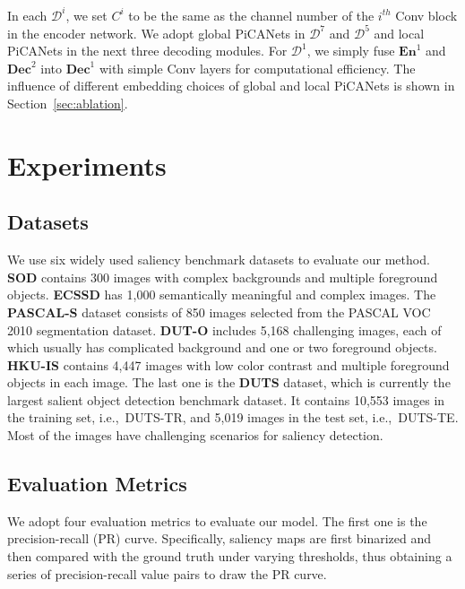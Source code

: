 \documentclass[10pt,twocolumn,letterpaper]{article}
\def\ie{i.e.,~} %
\begin{document}
In each $\mathcal D^i$, we set $C^i$ to be the same as the channel number of the $i^{th}$ Conv block in the encoder network. We adopt global PiCANets in $\mathcal D^7$ and $\mathcal D^5$ and local PiCANets in the next three decoding modules. For $\mathcal D^1$, we simply fuse $\bm{En}^1$ and $\bm{Dec}^2$ into $\bm{Dec}^1$ with simple Conv layers for computational efficiency. The influence of different embedding choices of global and local PiCANets is shown in Section~\ref{sec:ablation}.

\section{Experiments}
\subsection{Datasets}

We use six widely used saliency benchmark datasets to evaluate our method. \textbf{SOD} \cite{movahedi2010sod} contains 300 images with complex backgrounds and multiple foreground objects. \textbf{ECSSD} \cite{yan2013hs} has 1,000 semantically meaningful and complex images. The \textbf{PASCAL-S} \cite{li2014secrets} dataset consists of 850 images selected from the PASCAL VOC 2010 segmentation dataset. \textbf{DUT-O} \cite{yang2013gbmr} includes 5,168 challenging images, each of which usually has complicated background and one or two foreground objects. \textbf{HKU-IS} \cite{li2015mdf} contains 4,447 images with low color contrast and multiple foreground objects in each image. The last one is the \textbf{DUTS} \cite{wang2017duts} dataset, which is currently the largest salient object detection benchmark dataset. It contains 10,553 images in the training set, \ie DUTS-TR, and 5,019 images in the test set, \ie DUTS-TE. Most of the images have challenging scenarios for saliency detection.
\subsection{Evaluation Metrics}

We adopt four evaluation metrics to evaluate our model. The first one is the precision-recall (PR) curve. Specifically, saliency maps are first binarized and then compared with the ground truth under varying thresholds, thus obtaining a series of precision-recall value pairs to draw the PR curve.
\end{document}
